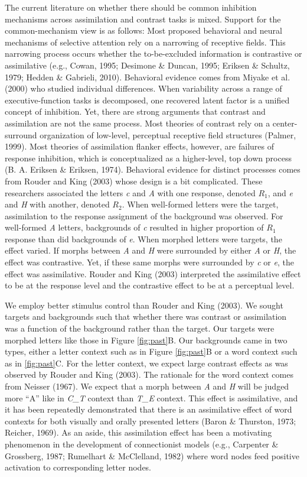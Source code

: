 \documentclass[english,floatsintext,man]{apa6}
\theoremstyle{definition}
\theoremstyle{definition}
\theoremstyle{definition}
\theoremstyle{remark}
\begin{document}
The current literature on whether there should be common inhibition
mechanisms across assimilation and contrast tasks is mixed. Support for
the common-mechanism view is as follows: Most proposed behavioral and
neural mechanisms of selective attention rely on a narrowing of
receptive fields. This narrowing process occurs whether the
to-be-excluded information is contrastive or assimilative (e.g., Cowan,
1995; Desimone \& Duncan, 1995; Eriksen \& Schultz, 1979; Hedden \&
Gabrieli, 2010). Behavioral evidence comes from Miyake et al. (2000) who
studied individual differences. When variability across a range of
executive-function tasks is decomposed, one recovered latent factor is a
unified concept of inhibition. Yet, there are strong arguments that
contrast and assimilation are not the same process. Most theories of
contrast rely on a center-surround organization of low-level, perceptual
receptive field structures (Palmer, 1999). Most theories of assimilation
flanker effects, however, are failures of response inhibition, which is
conceptualized as a higher-level, top down process (B. A. Eriksen \&
Eriksen, 1974). Behavioral evidence for distinct processes comes from
Rouder and King (2003) whose design is a bit complicated. These
researchers associated the letters \emph{c} and \emph{A} with one
response, denoted \(R_1\), and \emph{e} and \emph{H} with another,
denoted \(R_2\). When well-formed letters were the target, assimilation
to the response assignment of the background was observed. For
well-formed \emph{A} letters, backgrounds of \emph{c} resulted in higher
proportion of \(R_1\) response than did backgrounds of \emph{e}. When
morphed letters were targets, the effect varied. If morphs between
\emph{A} and \emph{H} were surrounded by either \emph{A} or \emph{H},
the effect was contrastive. Yet, if these same morphs were surrounded by
\emph{c} or \emph{e}, the effect was assimilative. Rouder and King
(2003) interpreted the assimilative effect to be at the response level
and the contrastive effect to be at a perceptual level.

We employ better stimulus control than Rouder and King (2003). We sought
targets and backgrounds such that whether there was contrast or
assimilation was a function of the background rather than the target.
Our targets were morphed letters like those in Figure \ref{fig:past}B.
Our backgrounds came in two types, either a letter context such as in
Figure \ref{fig:past}B or a word context such as in \ref{fig:past}C. For
the letter context, we expect large contrast effects as was observed by
Rouder and King (2003). The rationale for the word context comes from
Neisser (1967). We expect that a morph between \emph{A} and \emph{H}
will be judged more \enquote{A} like in \emph{C\_T} context than
\emph{T\_E} context. This effect is assimilative, and it has been
repeatedly demonstrated that there is an assimilative effect of word
contexts for both visually and orally presented letters (Baron \&
Thurston, 1973; Reicher, 1969). As an aside, this assimilation effect
has been a motivating phenomenon in the development of connectionist
models (e.g., Carpenter \& Grossberg, 1987; Rumelhart \& McClelland,
1982) where word nodes feed positive activation to corresponding letter
nodes.
\end{document}
